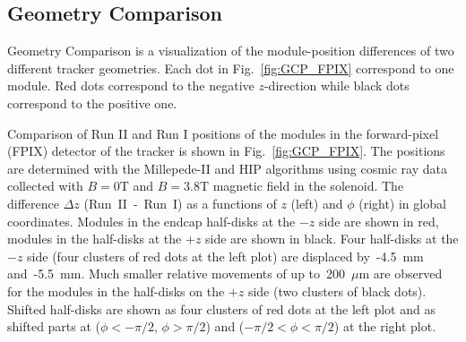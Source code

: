 \subsection{Geometry Comparison}
\label{sec:AlRes_GCP}

Geometry Comparison is a visualization of the module-position differences of two different tracker geometries. Each dot in Fig.~\ref{fig:GCP_FPIX} correspond to one module. Red dots correspond to the negative $z$-direction while black dots correspond to the positive one. 

Comparison of Run II and Run I positions of the modules in the forward-pixel (FPIX) detector of the tracker is shown in Fig.~\ref{fig:GCP_FPIX}. The positions are determined with the Millepede-II and HIP algorithms using cosmic ray data collected with $B=0$T and $B=3.8$T magnetic field in the solenoid. The difference $\Delta z$ (Run~II~-~Run~I) as a functions of $z$ (left) and $\phi$ (right) in global coordinates. Modules in the endcap half-disks at the $-z$ side are shown in red, modules in the half-disks at the $+z$ side are shown in black. Four half-disks at the $-z$ side (four clusters of red dots at the left plot) are displaced by~-4.5~mm and~-5.5~mm. Much smaller relative movements of up to~200~$\mu$m are observed for the modules in the half-disks on the $+z$ side (two clusters of black dots). Shifted half-disks are shown as four clusters of red dots at the left plot and as shifted parts at ($\phi<-\pi/2$, $\phi>\pi/2$) and ($-\pi/2<\phi<\pi/2$) at the right plot.

